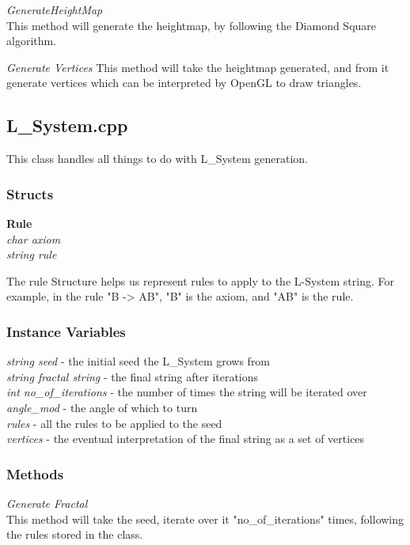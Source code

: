 \documentclass[a4paper,10pt]{report}
\begin{document}
\textit{GenerateHeightMap}\\
This method will generate the heightmap, by following the Diamond Square algorithm. \medskip

\textit{Generate Vertices}
This method will take the heightmap generated, and from it generate vertices which can be interpreted by OpenGL to draw triangles. 

\subsection{L\_System.cpp}
This class handles all things to do with L\_System generation.

\subsubsection{Structs}

\textbf{Rule}\\
\textit{char axiom}\\
\textit{string rule}\medskip

The rule Structure helps us represent rules to apply to the L-System string. For example, in the rule "B -> AB", "B" is the axiom, and "AB" is the rule.

\subsubsection{Instance Variables}
\textit{string seed} - the initial seed the L\_System grows from\\
\textit{string fractal string} - the final string after iterations\\
\textit{int no\_of\_iterations} - the number of times the string will be iterated over\\
\textit{angle\_mod} - the angle of which to turn\\
\textit{rules} - all the rules to be applied to the seed\\
\textit{vertices} - the eventual interpretation of the final string as a set of vertices\\

\subsubsection{Methods}

\textit{Generate Fractal}\\

This method will take the seed, iterate over it  "no\_of\_iterations" times, following the rules stored in the class.
\end{document}
